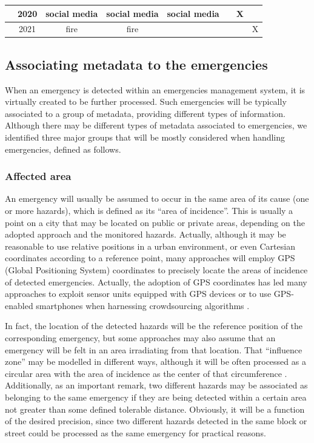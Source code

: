 \begin{refsection}
\begin{table}
\begin{tabular}{|c|c|c|c|c|c|c|c|}
    \citeauthor{twitterDetection1} \cite{twitterDetection1} & 2020 & social media & social media &  social media &  & X & \\
    
    \hline
    \citeauthor{fireBigdata1} \cite{fireBigdata1} & 2021 & fire & fire & & & & X \\
    
\end{tabular}
\end{table}

\subsection {Associating metadata to the emergencies}

When an emergency is detected within an emergencies management system, it is virtually created to be further processed. Such emergencies will be typically associated to a group of metadata, providing different types of information. Although there may be different types of metadata associated to emergencies, we identified three major groups that will be mostly considered when handling emergencies, defined as follows.

\subsubsection{Affected area}

An emergency will usually be assumed to occur in the same area of its cause (one or more hazards), which is defined as its ``area of incidence''. This is usually a point on a city that may be located on public or private areas, depending on the adopted approach and the monitored hazards. Actually, although it may be reasonable to use relative positions in a urban environment, or even Cartesian coordinates according to a reference point, many approaches will employ GPS (Global Positioning System) coordinates to precisely locate the areas of incidence of detected emergencies. Actually, the adoption of GPS coordinates has led many approaches to exploit sensor units equipped with GPS devices \cite{smartsensing1} or to use GPS-enabled smartphones when harnessing crowdsourcing algorithms \cite{smartsensing2}.

In fact, the location of the detected hazards will be the reference position of the corresponding emergency, but some approaches may also assume that an emergency will be felt in an area irradiating from that location. That ``influence zone'' may be modelled in different ways, although it will be often processed as a circular area with the area of incidence as the center of that circumference \cite{s150614370}. Additionally, as an important remark, two different hazards may be associated as belonging to the same emergency if they are being detected within a certain area not greater than some defined tolerable distance. Obviously, it will be a function of the desired precision, since two different hazards detected in the same block or street could be processed as the same emergency for practical reasons.


\end{refsection}
